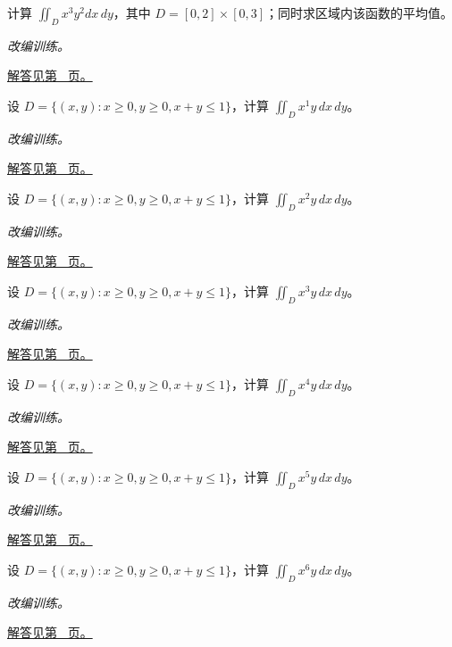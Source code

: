 \documentclass[12pt,fontset=fandol]{ctexart}
\begin{document}
\begin{example}[矩形区域上的乘积分离]\label{ex:c36q7}
计算 $\displaystyle\iint_Dx^{3}y^{2}dx\,dy$，其中 $D=[0,2]\times[0,3]$；同时求区域内该函数的平均值。
\par\textit{改编训练。}\par\hyperref[ans:c36q7]{解答见第~\pageref{ans:c36q7} 页。}
\end{example}
\begin{example}[三角形上的累次积分]\label{ex:c36q8}
设 $D=\{(x,y):x\ge0,y\ge0,x+y\le1\}$，计算 $\displaystyle\iint_Dx^{1}y\,dx\,dy$。
\par\textit{改编训练。}\par\hyperref[ans:c36q8]{解答见第~\pageref{ans:c36q8} 页。}
\end{example}
\begin{example}[三角形上的累次积分]\label{ex:c36q9}
设 $D=\{(x,y):x\ge0,y\ge0,x+y\le1\}$，计算 $\displaystyle\iint_Dx^{2}y\,dx\,dy$。
\par\textit{改编训练。}\par\hyperref[ans:c36q9]{解答见第~\pageref{ans:c36q9} 页。}
\end{example}
\begin{example}[三角形上的累次积分]\label{ex:c36q10}
设 $D=\{(x,y):x\ge0,y\ge0,x+y\le1\}$，计算 $\displaystyle\iint_Dx^{3}y\,dx\,dy$。
\par\textit{改编训练。}\par\hyperref[ans:c36q10]{解答见第~\pageref{ans:c36q10} 页。}
\end{example}
\begin{example}[三角形上的累次积分]\label{ex:c36q11}
设 $D=\{(x,y):x\ge0,y\ge0,x+y\le1\}$，计算 $\displaystyle\iint_Dx^{4}y\,dx\,dy$。
\par\textit{改编训练。}\par\hyperref[ans:c36q11]{解答见第~\pageref{ans:c36q11} 页。}
\end{example}
\begin{example}[三角形上的累次积分]\label{ex:c36q12}
设 $D=\{(x,y):x\ge0,y\ge0,x+y\le1\}$，计算 $\displaystyle\iint_Dx^{5}y\,dx\,dy$。
\par\textit{改编训练。}\par\hyperref[ans:c36q12]{解答见第~\pageref{ans:c36q12} 页。}
\end{example}
\begin{example}[三角形上的累次积分]\label{ex:c36q13}
设 $D=\{(x,y):x\ge0,y\ge0,x+y\le1\}$，计算 $\displaystyle\iint_Dx^{6}y\,dx\,dy$。
\par\textit{改编训练。}\par\hyperref[ans:c36q13]{解答见第~\pageref{ans:c36q13} 页。}
\end{example}
\end{document}
